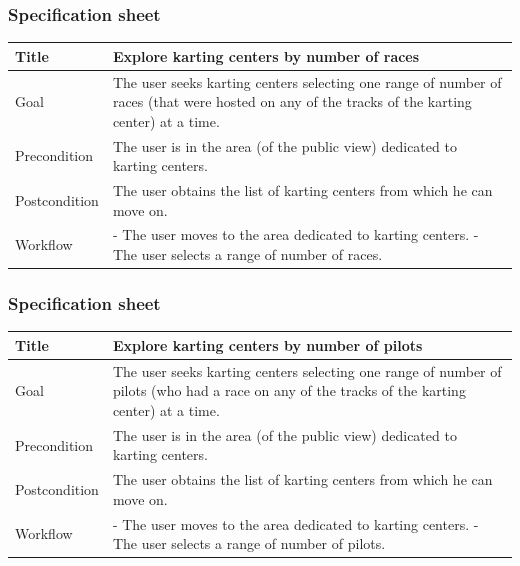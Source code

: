 \documentclass{beamer}
\begin{document}
\begin{frame}
    \frametitle{Specification sheet}
    \begin{table}
        \tiny
        \begin{tabular}{|p{2cm}|p{6cm}|}
        \hline
        Title & \textbf{Explore karting centers by number of races} \\
        \hline
        Goal & The user seeks karting centers selecting one range of number of races (that
        were hosted on any of the tracks of the karting center) at a time. \\
        \hline
        Precondition & The user is in the area (of the public view) dedicated to karting centers.\\
        \hline
        Postcondition & The user obtains the list of karting centers from which he can move on.\\
        \hline
        Workflow &
        - The user moves to the area dedicated to karting centers. \newline
        - The user selects a range of number of races. \\
        \hline
        \end{tabular}
\end{table}
\end{frame}


\begin{frame}
    \frametitle{Specification sheet}
    \begin{table}
        \tiny
        \begin{tabular}{|p{2cm}|p{6cm}|}
        \hline
        Title & \textbf{Explore karting centers by number of pilots} \\
        \hline
        Goal & The user seeks karting centers selecting one range of number of pilots (who had a race on 
        any of the tracks of the karting center) at a time. \\
        \hline
        Precondition & The user is in the area (of the public view) dedicated to karting centers.\\
        \hline
        Postcondition & The user obtains the list of karting centers from which he can move on.\\
        \hline
        Workflow &
        - The user moves to the area dedicated to karting centers. \newline
        - The user selects a range of number of pilots. \\
        \hline
        \end{tabular}
\end{table}
\end{frame}
\end{document}
